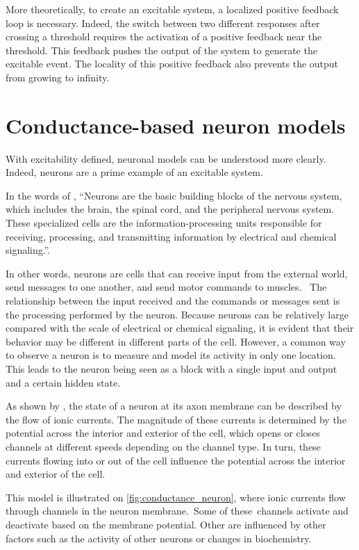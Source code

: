 More theoretically, to create an excitable system, a localized positive feedback loop is necessary. 
Indeed, the switch between two different responses after crossing a threshold requires the activation of a positive feedback near the threshold. 
This feedback pushes the output of the system to generate the excitable event.
The locality of this positive feedback also prevents the output from growing to infinity.

\section{Conductance-based neuron models}

With excitability defined, neuronal models can be understood more clearly. Indeed, neurons are a prime example of an excitable system.

In the words of \citet{neurDef}, \enquote{Neurons are the basic building blocks of the nervous system, which includes the brain, the spinal cord, and the peripheral nervous system. These specialized cells are the information-processing units responsible for receiving, processing, and transmitting information by electrical and chemical signaling.}.

In other words, neurons are cells that can receive input from the external world, send messages to one another, and send motor commands to muscles.  The relationship between the input received and the commands or messages sent is the processing performed by the neuron. Because neurons can be relatively large compared with the scale of electrical or chemical signaling, it is evident that their behavior may be different in different parts of the cell. However, a common way to observe a neuron is to measure and model its activity in only one location. This leads to the neuron being seen as a block with a single input and output and a certain hidden state.

As shown by \citet{neuronIons}, the state of a neuron at its axon membrane can be described by the flow of ionic currents. The magnitude of these currents is determined by the potential across the interior and exterior of the cell, which opens or closes channels at different speeds depending on the channel type. In turn, these currents flowing into or out of the cell influence the potential across the interior and exterior of the cell. 

This model is illustrated on \cref{fig:conductance_neuron}, where ionic currents flow through channels in the neuron membrane. Some of these channels activate and deactivate based on the membrane potential. Other are influenced by other factors such as the activity of other neurons or changes in biochemistry.

